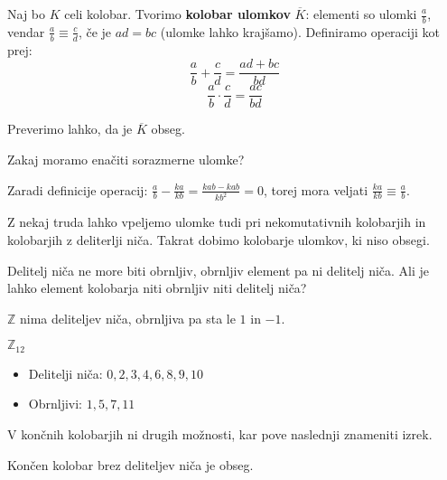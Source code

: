 \documentclass[11pt, a4paper]{article}
\begin{document}
    Naj bo \(K\) celi kolobar. Tvorimo \textbf{kolobar ulomkov} \(\overline{K}\): elementi so ulomki \(\frac{a}{b}\), vendar \(\frac{a}{b} \equiv \frac{c}{d}\), če je \(ad = bc\) (ulomke lahko krajšamo). Definiramo operaciji kot prej:
    \[\frac{a}{b} + \frac{c}{d} = \frac{ad + bc}{bd}\]
    \[\frac{a}{b} \cdot \frac{c}{d} = \frac{ac}{bd}\]

    Preverimo lahko, da je \(\overline{K}\) obseg.
    \par
    Zakaj moramo enačiti sorazmerne ulomke?
    \par
    Zaradi definicije operacij: \(\frac{a}{b} - \frac{ka}{kb} = \frac{kab - kab}{kb^2} = 0\), torej mora veljati \(\frac{ka}{kb} \equiv \frac{a}{b}\).

    \begin{remark}
        Z nekaj truda lahko vpeljemo ulomke tudi pri nekomutativnih kolobarjih in kolobarjih z deliterlji niča. Takrat dobimo kolobarje ulomkov, ki niso obsegi.
    \end{remark}

    Delitelj niča ne more biti obrnljiv, obrnljiv element pa ni delitelj niča. Ali je lahko element kolobarja niti obrnljiv niti delitelj niča?
    \begin{example}
        \(\mathbb{Z}\) nima deliteljev niča, obrnljiva pa sta le \(1\) in \(-1\).
    \end{example}

    \begin{example}
        \(\mathbb{Z}_{12}\)
        \begin{itemize}
            \item Delitelji niča: \(0,2,3,4,6,8,9,10\)
            \item Obrnljivi: \(1,5,7,11\)
        \end{itemize}
    \end{example}

    V končnih kolobarjih ni drugih možnosti, kar pove naslednji znameniti izrek.

    \begin{theorem}
        Končen kolobar brez deliteljev niča je obseg.
    \end{theorem}
\end{document}
